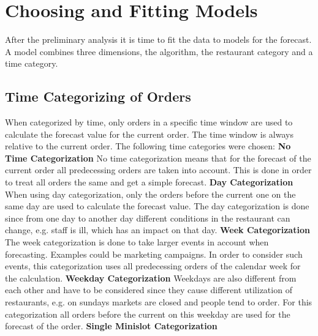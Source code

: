\section{Choosing and Fitting Models}\label{Choosing and Fitting Models}
After the preliminary analysis it is time to fit the data to models for the forecast. A model combines three dimensions, the algorithm, the restaurant category and a time category.
\subsection{Time Categorizing of Orders}\label{subsection:Categorizing by Order}
When categorized by time, only orders in a specific time window are used to calculate the forecast value for the current order. The time window is always relative to the current order. The following time categories were chosen:\newline
\newline\textbf{No Time Categorization}\newline
No time categorization means that for the forecast of the current order all predecessing orders are taken into account. This is done in order to treat all orders the same and get a simple forecast.
\newline\textbf{Day Categorization}\newline
When using day categorization, only the orders before the current one on the same day are used to calculate the forecast value. The day categorization is done since from one day to another day different conditions in the restaurant can change, e.g. staff is ill, which has an impact on that day.
\newline\textbf{Week Categorization}\newline
The week categorization is done to take larger events in account when forecasting. Examples could be marketing campaigns. In order to consider such events, this categorization uses all predecessing orders of the calendar week for the calculation.
\newline\textbf{Weekday Categorization}\newline
Weekdays are also different from each other and have to be considered since they cause different utilization of restaurants, e.g. on sundays markets are closed and people tend to order. For this categorization all orders before the current on this weekday are used for the forecast of the order.
\newline\textbf{Single Minislot Categorization}\newline
